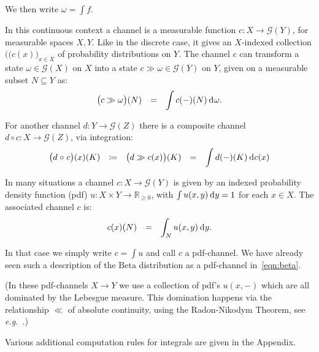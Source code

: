 \documentclass{mscs}
\newcommand{\after}{\mathrel{\circ}}
\newcommand{\Giry}{\mathcal{G}}
\newcommand{\R}{\mathbb{R}}
\newcommand{\intd}{{\kern.2em}\mathrm{d}{\kern.03em}}
\newcommand{\betachan}{\ensuremath{\mathrm{Beta}}}
\begin{document}
\noindent We then write $\omega = \int f$.

In this continuous context a channel is a measurable function $c\colon
X \rightarrow \Giry(Y)$, for measurable spaces $X,Y$. Like in the
discrete case, it gives an $X$-indexed collection
$(\big(c(x)\big)_{x\in X}$ of probability distributions on $Y$. 
The channel $c$ can transform a state $\omega\in\Giry(X)$ on $X$ 
into a state $c \gg \omega \in\Giry(Y)$ on $Y$, given on a measurable
subset $N\subseteq Y$ as:
\begin{equation}
\label{eqn:statetransformation}
\begin{array}{rcl}
\big(c \gg \omega\big)(N)
& = &
\displaystyle\int c(-)(N) \intd \omega.
\end{array}
\end{equation}

\noindent For another channel $d\colon Y \rightarrow \Giry(Z)$ there
is a composite channel $d \after c \colon X \rightarrow \Giry(Z)$, via
integration:
\begin{equation}
\label{eqn:continuouscomposition}
\begin{array}{rcccl}
\big(d \after c\big)(x)(K)
& \coloneqq &
\big(d \gg c(x)\big)(K)
& = &
\displaystyle\int d(-)(K) \intd c(x)
\end{array}
\end{equation}

In many situations a channel $c\colon X \rightarrow \Giry(Y)$ is given
by an indexed probability density function (pdf) $u\colon X \times Y
\rightarrow \R_{\geq 0}$, with $\int u(x,y)\intd y = 1$ for each $x\in
X$.  The associated channel $c$ is:
\begin{equation}
\label{eqn:channelfrompdf}
\begin{array}{rcl}
c(x)(N)
& = &
\displaystyle \int_{N} u(x,y) \intd y.
\end{array}
\end{equation} 

\noindent In that case we simply write $c = \int u$ and call $c$ a
pdf-channel. We have already seen such a description of the
$\betachan$ distribution as a pdf-channel in~\eqref{eqn:beta}.

(In these pdf-channels $X \rightarrow Y$ we use a collection of pdf's
$u(x,-)$ which are all dominated by the Lebesgue measure. This
domination happens via the relationship $\ll$ of absolute continuity,
using the Radon-Nikodym Theorem, see
\textit{e.g.}~\cite{Panangaden09}.)

Various additional computation rules for integrals are given in the
Appendix.
\end{document}
